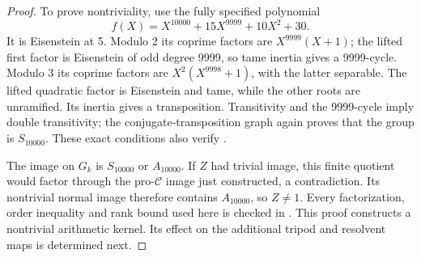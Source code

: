 \begin{proof}
To prove nontriviality, use the fully specified polynomial
\[
 f(X)=X^{10000}+15X^{9999}+10X^2+30.
\]
It is Eisenstein at 5. Modulo 2 its coprime factors are
\(X^{9999}(X+1)\); the lifted first factor is Eisenstein of odd
degree 9999, so tame inertia gives a 9999-cycle. Modulo 3 its coprime
factors are \(X^2(X^{9998}+1)\), with the latter separable. The
lifted quadratic factor is Eisenstein and tame, while the other roots
are unramified. Its inertia gives a transposition. Transitivity and
the 9999-cycle imply double transitivity; the conjugate-transposition
graph again proves that the group is \(S_{10000}\). These exact
conditions also verify \citet[Corollary 1 to Theorem 3, p.~442]{SymOsada1987}.

The image on \(G_k\) is \(S_{10000}\) or \(A_{10000}\). If
\(Z\) had trivial image, this finite quotient would factor through
the pro-\(\mathscr C\) image just constructed, a contradiction.
Its nontrivial normal image therefore contains \(A_{10000}\), so
\(Z\ne1\). Every factorization, order inequality and rank bound
used here is checked in .
This proof constructs a nontrivial arithmetic kernel. Its effect on
the additional tripod and resolvent maps is determined next.
\end{proof}

